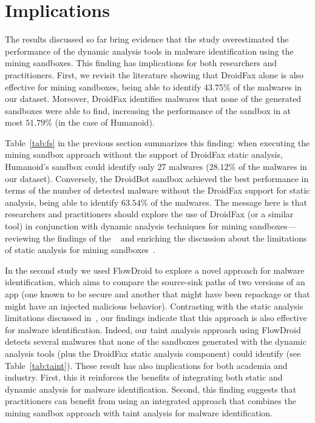 \section{Implications}\label{sec:implications}

The results discussed so far bring evidence
that the \blls study overestimated the
performance of the dynamic analysis tools in
malware identification using the mining sandboxes.
This finding has implications for both
researchers and practitioners. First,
we revisit the literature showing that
DroidFax alone is also effective for mining
sandboxes, being able to identify 43.75\%
of the malwares in our dataset. Moreover,
DroidFax identifies malwares that
none of the generated sandboxes
were able to find, increasing the
performance of the sandbox in at most $51.79\%$ (in the
case of Humanoid).

Table~\ref{tab:fs} in the previous section summarizes this finding: when
executing the mining sandbox approach without the
support of DroidFax static analysis, Humanoid's sandbox
could identify only 27 malwares ($28.12\%$ of the
malwares in our dataset).
Conversely, the DroidBot sandbox achieved the best performance in
terms of the number of detected malware without the DroidFax support for static analysis,
being able to identify $63.54\%$ of the malwares.
The message
here is that researchers and practitioners should
explore the use of DroidFax (or a similar tool) in conjunction 
with dynamic analysis techniques for mining sandboxes---
reviewing the findings of the \blls~\cite{DBLP:conf/wcre/BaoLL18}
and enriching the discussion about
the limitations of static analysis for
mining sandboxes~\cite{DBLP:conf/icse/JamrozikSZ16}.

In the second study we used FlowDroid
to explore a novel approach for malware identification,
which aims to compare the source-sink paths of two
versions of an app (one known to
be secure and another that might
have been repackage or that might have
an injected malicious behavior).
Contrasting with the static
analysis limitations discussed in~\cite{DBLP:conf/icse/JamrozikSZ16},
our findings indicate that
this approach is also effective for malware
identification. Indeed, our taint
analysis approach using FlowDroid
detects several malwares
that none of the sandboxes generated
with the dynamic analysis tools (plus
the DroidFax static analysis component)
could identify (see Table~\ref{tab:taint}). These
result has also implications
for both academia and industry. First,
this it reinforces the benefits
of integrating both static and
dynamic analysis for malware identification.
Second, this finding suggests that
practitioners can benefit from using
an integrated approach that
combines the mining sandbox approach
with taint analysis for malware
identification. 


